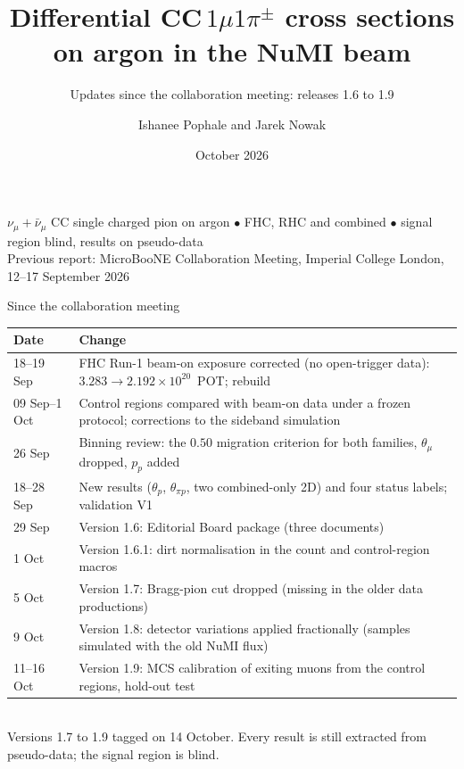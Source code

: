 \documentclass[aspectratio=169,10pt]{beamer}
\title[CC$1\mu1\pi^{\pm}$ update]{Differential CC$\,1\mu1\pi^{\pm}$ cross sections on argon in the NuMI beam}
\subtitle{Updates since the collaboration meeting: releases 1.6 to 1.9}
\author[Pophale, Nowak]{Ishanee Pophale and Jarek Nowak}
\institute{Lancaster University}
\date{October 2026}
\begin{document}
{
\begin{frame}[plain]
  \titlepage
  \begin{center}\small\color{ubdark}
  $\nu_\mu+\bar\nu_\mu$ CC single charged pion on argon \;$\bullet$\; FHC, RHC and combined \;$\bullet$\; signal region blind,
  results on pseudo-data\\[3pt]
  \footnotesize Previous report: MicroBooNE Collaboration Meeting, Imperial College London, 12--17 September 2026
  \end{center}
\end{frame}}

\begin{frame}{Since the collaboration meeting}
  \small
  \begin{tabular}{p{}p{}}
    \toprule
    Date & Change \\
    \midrule
    18--19 Sep & FHC Run-1 beam-on exposure corrected (no open-trigger data): $3.283\to2.192\times10^{20}$~POT; rebuild \\
    09 Sep--1 Oct & Control regions compared with beam-on data under a frozen protocol; corrections to the sideband simulation \\
    26 Sep & Binning review: the $0.50$ migration criterion for both families, $\theta_\mu$ dropped, $p_p$ added \\
    18--28 Sep & New results ($\theta_p$, $\theta_{\pi p}$, two combined-only 2D) and four status labels; validation V1 \\
    29 Sep & Version 1.6: Editorial Board package (three documents) \\
    1 Oct & Version 1.6.1: dirt normalisation in the count and control-region macros \\
    5 Oct & Version 1.7: Bragg-pion cut dropped (missing in the older data productions) \\
    9 Oct & Version 1.8: detector variations applied fractionally (samples simulated with the old NuMI flux) \\
    11--16 Oct & Version 1.9: MCS calibration of exiting muons from the control regions, hold-out test \\
    \bottomrule
  \end{tabular}\\[2mm]
  \footnotesize Versions 1.7 to 1.9 tagged on 14 October. Every result is still extracted from pseudo-data; the signal region is blind.
\end{frame}
\end{document}
